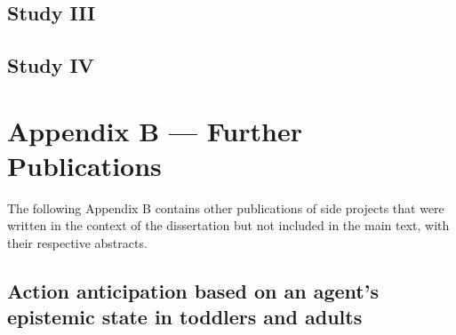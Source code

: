 \documentclass[
]{scrbook}
\begin{document}
\begin{minipage}{\textwidth}

\end{minipage}



\newpage

\section*{Study III}\label{studyIII}

\begin{minipage}{\textwidth}

\end{minipage}



\newpage

\section*{Study IV}\label{studyIV}

\begin{minipage}{\textwidth}

\end{minipage}



\chapter*{Appendix B --- Further Publications}\label{appendixB}

The following Appendix B contains other publications of side projects that were written in the context of the dissertation but not included in the main text, with their respective abstracts.

\section*{Action anticipation based on an agent's epistemic state in toddlers and adults}\label{manybabies}
\end{document}

